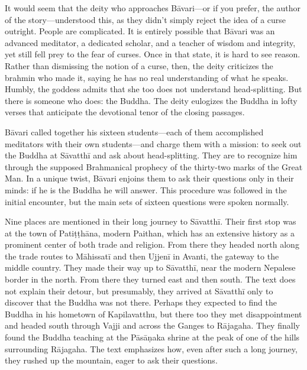 \documentclass[12pt,openany]{book}%
\begin{document}
It would seem that the deity who approaches \textsanskrit{Bāvari}—or if you prefer, the author of the story—understood this, as they didn’t simply reject the idea of a curse outright. People are complicated. It is entirely possible that \textsanskrit{Bāvari} was an advanced meditator, a dedicated scholar, and a teacher of wisdom and integrity, yet still fell prey to the fear of curses. Once in that state, it is hard to see reason. Rather than dismissing the notion of a curse, then, the deity criticizes the brahmin who made it, saying he has no real understanding of what he speaks. Humbly, the goddess admits that she too does not understand head-splitting. But there is someone who does: the Buddha. The deity eulogizes the Buddha in lofty verses that anticipate the devotional tenor of the closing passages.

\textsanskrit{Bāvari} called together his sixteen students—each of them accomplished meditators with their own students—and charge them with a mission: to seek out the Buddha at \textsanskrit{Sāvatthī} and ask about head-splitting. They are to recognize him through the supposed Brahmanical prophecy of the thirty-two marks of the Great Man. In a unique twist, \textsanskrit{Bāvari} enjoins them to ask their questions only in their minds: if he is the Buddha he will answer. This procedure was followed in the initial encounter, but the main sets of sixteen questions were spoken normally.

Nine places are mentioned in their long journey to \textsanskrit{Sāvatthī}. Their first stop was at the town of \textsanskrit{Patiṭṭhāna}, modern Paithan, which has an extensive history as a prominent center of both trade and religion. From there they headed north along the trade routes to \textsanskrit{Māhissatī} and then \textsanskrit{Ujjenī} in Avanti, the gateway to the middle country. They made their way up to \textsanskrit{Sāvatthī}, near the modern Nepalese border in the north. From there they turned east and then south. The text does not explain their detour, but presumably, they arrived at \textsanskrit{Sāvatthī} only to discover that the Buddha was not there. Perhaps they expected to find the Buddha in his hometown of Kapilavatthu, but there too they met disappointment and headed south through Vajji and across the Ganges to \textsanskrit{Rājagaha}. They finally found the Buddha teaching at the \textsanskrit{Pāsāṇaka} shrine at the peak of one of the hills surrounding \textsanskrit{Rājagaha}. The text emphasizes how, even after such a long journey, they rushed up the mountain, eager to ask their questions.
\end{document}
